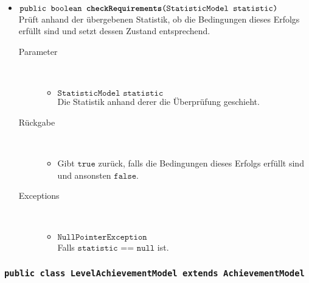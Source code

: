 \begin{description}
\begin{itemize}
		\item $\texttt{public boolean \textbf{checkRequirements}(StatisticModel statistic)}$ \\ Prüft anhand der übergebenen Statistik, ob die Bedingungen dieses Erfolgs erfüllt sind und setzt dessen Zustand entsprechend.
		\begin{description}
		\item[Parameter] \hfill \\
			\vspace{-.8cm}
			\begin{itemize}
				\item $\texttt{StatisticModel statistic}$ \\ Die Statistik anhand derer die Überprüfung geschieht. 
			\end{itemize}
			\item[Rückgabe] \hfill \\
			\vspace{-.8cm}
			\begin{itemize}
				\item Gibt $\texttt{true}$ zurück, falls die Bedingungen dieses Erfolgs erfüllt sind und ansonsten $\texttt{false}$.
			\end{itemize}
			\item[Exceptions] \hfill \\
			\vspace{-.8cm}
			\begin{itemize}
				\item $\texttt{NullPointerException}$ \\ Falls $\texttt{statistic == null}$ ist.
			\end{itemize}
		\end{description}
	\end{itemize}
\end{description}

\subsubsection{\normalfont \texttt{public class \textbf{LevelAchievementModel} extends AchievementModel}}

